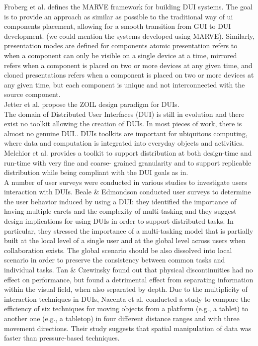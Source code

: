 Froberg et al. \cite{froberg2011model} defines the MARVE framework for building
DUI systems. The goal is to provide an approach as similar as possible to
the traditional way of ui components placement, allowing for a smooth
transition from GUI to DUI development. (we could mention the systems
developed using MARVE). Similarly, presentation modes are defined for
components atomic presentation refers to when a component can only be visible on a single
device at a time, mirrored refers when a component is placed on two or more
devices at any given time, and cloned presentations refers when a component is
placed on two or more devices at any given time, but each component is unique
and not interconnected with the source component.\\

Jetter et al. \cite{jetter2012design} propose the ZOIL design paradigm for
DUIs.\\
 
The domain of Distributed User Interfaces (DUI) is still in evolution and there exist no toolkit allowing the creation of DUIs.
In most pieces of work, there is almost no genuine
DUI.\cite{melchior2011distribution}. DUIs toolkits are important for ubiquitous computing, where data and computation is integrated into everyday objects and activities.\cite{elmqvist2011distributed}\\
Melchior et al. \cite{melchior69toolkit} provides a toolkit to support
distribution at both design-time and run-time with very fine and coarse- grained granularity and to support replicable distribution while being compliant with the DUI goals as in.\\

A number of user surveys were conducted in various studies to investigate users
interaction with DUIs. \cite{vanderdonckt2010distributed} Beale & Edmondson
\cite{beale2007multiple} conducted user surveys to determine the user behavior
induced by using a DUI:
they identified the importance of having multiple carets and the complexity of multi-tasking and they suggest design implications for using DUIs in order to support distributed
tasks. In particular, they stressed the importance of a multi-tasking model that
is partially built at the local level of a single user and at the global level
across users when collaboration exists. The global scenario should be also
dissolved into local scenario in order to preserve the consistency between
common tasks and individual tasks. Tan & Czewinsky \cite{tan2003effects} found
out that physical discontinuities had no effect on performance, but found a detrimental effect from separating information within the visual field, when also separated by depth. Due to the multiplicity of interaction techniques in DUIs, Nacenta et al. conducted a study to compare the efficiency of six techniques for moving objects from a platform (e.g., a tablet) to another one (e.g., a tabletop) in four different distance ranges and with three movement directions. Their study suggests that spatial manipulation of data was faster than pressure-based techniques.\\

